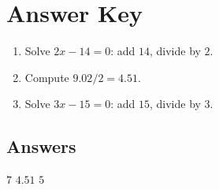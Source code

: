 \documentclass[12pt]{article}
\begin{document}
\section*{Answer Key}

\begin{enumerate}
  \item Solve $2x - 14 = 0$: add $14$, divide by $2$.
  \item Compute $9.02 / 2 = 4.51$.
  \item Solve $3x - 15 = 0$: add $15$, divide by $3$.
\end{enumerate}

\subsection*{Answers}
$\boxed{7}$ \quad $\boxed{4.51}$ \quad $\boxed{5}$
\end{document}
